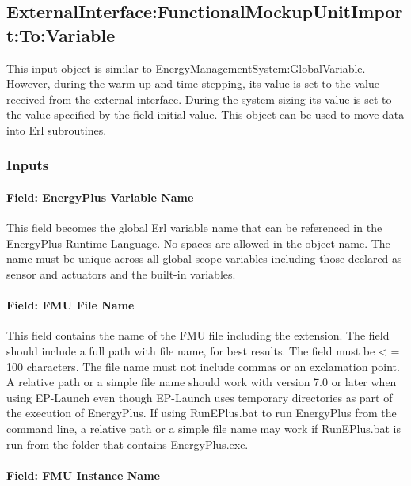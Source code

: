 \subsection{ExternalInterface:FunctionalMockupUnitImport:To:Variable}\label{externalinterfacefunctionalmockupunitimporttovariable}

This input object is similar to EnergyManagementSystem:GlobalVariable. However, during the warm-up and time stepping, its value is set to the value received from the external interface. During the system sizing its value is set to the value specified by the field initial value. This object can be used to move data into Erl subroutines.

\subsubsection{Inputs}\label{inputs-8-007}

\paragraph{Field: EnergyPlus Variable Name}\label{field-energyplus-variable-name-3}

This field becomes the global Erl variable name that can be referenced in the EnergyPlus Runtime Language. No spaces are allowed in the object name. The name must be unique across all global scope variables including those declared as sensor and actuators and the built-in variables.

\paragraph{Field: FMU File Name}\label{field-fmu-file-name-4}

This field contains the name of the FMU file including the extension. The field should include a full path with file name, for best results. The field must be \textless{} = 100 characters. The file name must not include commas or an exclamation point. A relative path or a simple file name should work with version 7.0 or later when using EP-Launch even though EP-Launch uses temporary directories as part of the execution of EnergyPlus. If using RunEPlus.bat to run EnergyPlus from the command line, a relative path or a simple file name may work if RunEPlus.bat is run from the folder that contains EnergyPlus.exe.

\paragraph{Field: FMU Instance Name}\label{field-fmu-instance-name-3}

